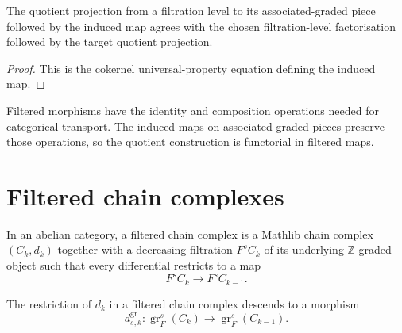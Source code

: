 \begin{lemma}
  \leanok
  \label{lem:core-associated-graded-map-projection}
  The quotient projection from a filtration level to its associated-graded
  piece followed by the induced map agrees with the chosen filtration-level
  factorisation followed by the target quotient projection.
\end{lemma}

\begin{proof}
  \leanok
  This is the cokernel universal-property equation defining the induced map.
\end{proof}

\begin{definition}
  \leanok
  \label{def:core-filtered-morphism-functoriality}
  Filtered morphisms have the identity and composition operations needed for
  categorical transport.  The induced maps on associated graded pieces
  preserve those operations, so the quotient construction is functorial in
  filtered maps.
\end{definition}

\section{Filtered chain complexes}

\begin{definition}
  \leanok
  \label{def:core-filtered-chain-complex}
  In an abelian category, a filtered chain complex is a Mathlib chain complex
  $(C_k,d_k)$ together with a decreasing filtration $F^sC_k$ of its underlying
  $\mathbb Z$-graded object such that every differential restricts to a map
  \[
    F^sC_k\longrightarrow F^sC_{k-1}.
  \]
\end{definition}

\begin{definition}
  \leanok
  \label{def:core-associated-graded-differential}
  The restriction of $d_k$ in a filtered chain complex descends to a morphism
  \[
    d^{\operatorname{gr}}_{s,k}:
    \operatorname{gr}^s_F(C_k)\longrightarrow
    \operatorname{gr}^s_F(C_{k-1}).
  \]
\end{definition}

